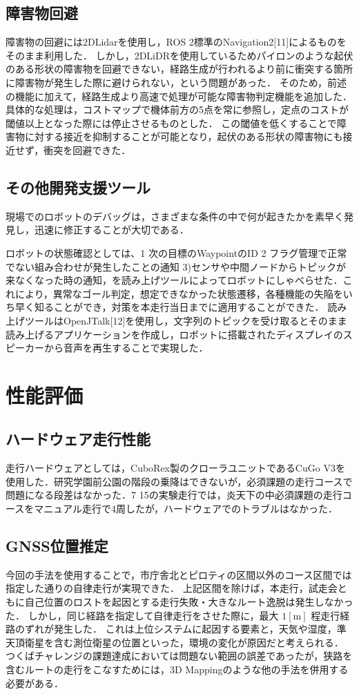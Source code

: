 \documentclass[platex,dvipdfmx]{rbproceedings}
\begin{document}
\subsection{障害物回避}
障害物の回避には2DLidarを使用し，ROS 2標準のNavigation2[11]によるものをそのまま利用した．
しかし，2DLiDRを使用しているためパイロンのような起伏のある形状の障害物を回避できない，経路生成が行われるより前に衝突する箇所に障害物が発生した際に避けられない，という問題があった．
そのため，前述の機能に加えて，経路生成より高速で処理が可能な障害物判定機能を追加した．
具体的な処理は，コストマップで機体前方の5点を常に参照し，定点のコストが閾値以上となった際には停止させるものとした．
この閾値を低くすることで障害物に対する接近を抑制することが可能となり，起伏のある形状の障害物にも接近せず，衝突を回避できた．

\subsection{その他開発支援ツール}
現場でのロボットのデバッグは，さまざまな条件の中で何が起きたかを素早く発見し，迅速に修正することが大切である．

ロボットの状態確認としては、1  次の目標のWaypointのID 2  フラグ管理で正常でない組み合わせが発生したことの通知 3)センサや中間ノードからトピックが来なくなった時の通知，を読み上げツールによってロボットにしゃべらせた．これにより，異常なゴール判定，想定できなかった状態遷移，各種機能の失陥をいち早く知ることができ，対策を本走行当日までに適用することができた．
読み上げツールはOpenJTalk[12]を使用し，文字列のトピックを受け取るとそのまま読み上げるアプリケーションを作成し，ロボットに搭載されたディスプレイのスピーカーから音声を再生することで実現した．

\section{性能評価}
\subsection{ハードウェア走行性能}
走行ハードウェアとしては，CuboRex製のクローラユニットであるCuGo V3を使用した．研究学園前公園の階段の乗降はできないが，必須課題の走行コースで問題になる段差はなかった．7 15の実験走行では，炎天下の中必須課題の走行コースをマニュアル走行で4周したが，ハードウェアでのトラブルはなかった．

\subsection{GNSS位置推定}
今回の手法を使用することで，市庁舎北とピロティの区間以外のコース区間では指定した通りの自律走行が実現できた．
上記区間を除けば，本走行，試走会ともに自己位置のロストを起因とする走行失敗・大きなルート逸脱は発生しなかった．
しかし，同じ経路を指定して自律走行をさせた際に，最大 $1[\mathrm{m}]$ 程走行経路のずれが発生した．
これは上位システムに起因する要素と，天気や湿度，準天頂衛星を含む測位衛星の位置といった，環境の変化が原因だと考えられる．
つくばチャレンジの課題達成においては問題ない範囲の誤差であったが，狭路を含むルートの走行をこなすためには，3D Mappingのような他の手法を併用する必要がある．
\end{document}
